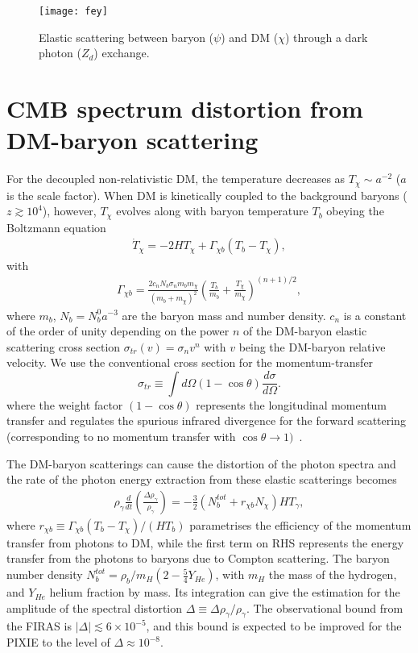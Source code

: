 \documentclass[5p,times]{elsarticle}
\newcommand{\dis}[1]{\begin{equation}\begin{split}#1\end{split}\end{equation}}
\begin{document}
   \begin{figure} [h]
\begin{center}
\texttt{[image: fey]}
\end{center}
\caption{Elastic scattering between baryon ($\psi$) and DM ($\chi$) through a dark photon ($Z_d$) exchange.  }
\label{diagram}
\end{figure}
  
  \section{CMB spectrum distortion from DM-baryon scattering}
  \label{cmbdmb}
For the decoupled non-relativistic DM, the temperature decreases as $T_\chi \sim a^{-2}$ ($a$ is the scale factor). When DM is kinetically coupled to the background baryons ($z\gtrsim 10^4$), however, $T_\chi$ evolves along with baryon temperature $T_b$ obeying the Boltzmann equation~\cite{Dvorkin:2013cea,Ali-Haimoud:2015pwa} 
\dis{
\label{tempeq} 
\dot{T}_\chi = -2H T_\chi +\Gamma_{\chi b} (T_b-T_\chi),
}
with 
\dis{
\Gamma_{\chi b} = \frac{2c_n N_b \sigma_n m_b m_\chi}{(m_b+m_\chi)^2} \left( \frac{T_b}{m_b} +\frac{T_\chi}{m_\chi} \right)^{(n+1)/2},
\label{Gamchib}
}
where $m_b$, $N_b=N_b^0 a^{-3}$ are the baryon mass and number density. $c_n$ is a constant of the order of unity depending on the power $n$ of the DM-baryon elastic scattering cross section $\sigma_{tr} (v) =  \sigma_n v^n$ with $v$ being the DM-baryon relative velocity.  We use the conventional cross section for the momentum-transfer
   \begin{equation}
   \label{eq:sig}
\sigma_{tr}\equiv\int d\Omega(1-\cos\theta)\frac{d\sigma}{d\Omega}.
\end{equation}
   where the weight factor $(1-\cos \theta)$ represents the longitudinal momentum transfer and regulates the spurious infrared divergence for the forward scattering (corresponding to no momentum transfer with $\cos \theta \rightarrow 1)$~\cite{raby1987}.
   

   The DM-baryon scatterings can cause the distortion of the photon spectra and the rate of the photon energy extraction from these elastic scatterings becomes \cite{Chluba:2011hw,Ali-Haimoud:2015pwa}
   \dis{
   \label{derivrho}
   \rho_{\gamma} \frac{d}{dt}
\left( \frac{\Delta \rho_{\gamma}}{\rho_{\gamma}} \right)
= - \frac{3}{2} \left( N_b^{tot} + r_{\chi b} N_{\chi} \right) H T_{\gamma},
}
where $r_{\chi b}\equiv \Gamma_{\chi b}(T_b-T_{\chi})/(H T_b)$ parametrises  the efficiency of the momentum transfer from photons to DM, while the first term on RHS represents the energy transfer from the photons to baryons due to Compton scattering. The baryon number density $N_b^{tot}=\rho_b/m_H(2-\frac{5}{4}Y_{He})$, with $m_H$ the mass of the hydrogen, and $Y_{He}$ helium fraction by mass.
Its integration can give the estimation for the amplitude of the spectral distortion $\Delta\equiv\Delta\rho_{\gamma}/\rho_{\gamma}$. The observational bound from the FIRAS is $|\Delta| \lesssim 6 \times 10^{-5}$, and this bound is expected to be improved for the PIXIE to the level of $\Delta\approx 10^{-8}$.
\end{document}
